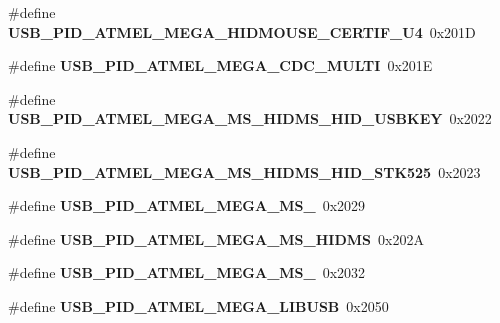 \begin{DoxyCompactItemize}
\item 
\mbox{\label{group__usb__atmel__ids__group_ga3b4af600b6b2b5afc7ca55a6686d9bea}} 
\#define {\bfseries U\+S\+B\+\_\+\+P\+I\+D\+\_\+\+A\+T\+M\+E\+L\+\_\+\+M\+E\+G\+A\+\_\+\+H\+I\+D\+M\+O\+U\+S\+E\+\_\+\+C\+E\+R\+T\+I\+F\+\_\+\+U4}~0x201D
\item 
\mbox{\label{group__usb__atmel__ids__group_ga2a5eaaf1184fd8295e0fa4c95d0d2be2}} 
\#define {\bfseries U\+S\+B\+\_\+\+P\+I\+D\+\_\+\+A\+T\+M\+E\+L\+\_\+\+M\+E\+G\+A\+\_\+\+C\+D\+C\+\_\+\+M\+U\+L\+TI}~0x201E
\item 
\mbox{\label{group__usb__atmel__ids__group_ga79aa6a09475a9fbcbb30416b7752349e}} 
\#define {\bfseries U\+S\+B\+\_\+\+P\+I\+D\+\_\+\+A\+T\+M\+E\+L\+\_\+\+M\+E\+G\+A\+\_\+\+M\+S\+\_\+\+H\+I\+D\+M\+S\+\_\+\+H\+I\+D\+\_\+\+U\+S\+B\+K\+EY}~0x2022
\item 
\mbox{\label{group__usb__atmel__ids__group_ga56d6948e6453977046c3fb85e0ff8f48}} 
\#define {\bfseries U\+S\+B\+\_\+\+P\+I\+D\+\_\+\+A\+T\+M\+E\+L\+\_\+\+M\+E\+G\+A\+\_\+\+M\+S\+\_\+\+H\+I\+D\+M\+S\+\_\+\+H\+I\+D\+\_\+\+S\+T\+K525}~0x2023
\item 
\mbox{\label{group__usb__atmel__ids__group_gab485e4b690d9238e96d1b7bb76e76237}} 
\#define {\bfseries U\+S\+B\+\_\+\+P\+I\+D\+\_\+\+A\+T\+M\+E\+L\+\_\+\+M\+E\+G\+A\+\_\+\+M\+S\+\_}~0x2029
\item 
\mbox{\label{group__usb__atmel__ids__group_ga9212dd62110d78c0ba313dbc93178de6}} 
\#define {\bfseries U\+S\+B\+\_\+\+P\+I\+D\+\_\+\+A\+T\+M\+E\+L\+\_\+\+M\+E\+G\+A\+\_\+\+M\+S\+\_\+\+H\+I\+D\+MS}~0x202A
\item 
\mbox{\label{group__usb__atmel__ids__group_ga7c7d2af4b6241c33e3addd3573e4d542}} 
\#define {\bfseries U\+S\+B\+\_\+\+P\+I\+D\+\_\+\+A\+T\+M\+E\+L\+\_\+\+M\+E\+G\+A\+\_\+\+M\+S\+\_}~0x2032
\item 
\mbox{\label{group__usb__atmel__ids__group_ga5dd1ecf3da98d83961de2f5de443e1c5}} 
\#define {\bfseries U\+S\+B\+\_\+\+P\+I\+D\+\_\+\+A\+T\+M\+E\+L\+\_\+\+M\+E\+G\+A\+\_\+\+L\+I\+B\+U\+SB}~0x2050
\end{DoxyCompactItemize}
